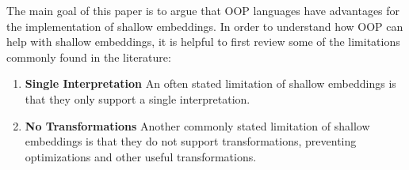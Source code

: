 \begin{comment}
If we accept Cook's view on OOP, 
a natural way to distinguish implementations of EDSLs is 
in terms of the data abstraction used to model the language
constructs instead. As Reynold's~\cite{reynolds94proceduralabstraction} suggested there are two
types of data abstraction: procedural abstraction and \emph{user-defined
  types}. It is clear that shallow embeddings use \emph{procedural
  abstraction}: the DSLs are modelled by interpretation
functions. Thus, the other implementation option for EDSLs is to
use \emph{user-defined types}. In Reynolds terminology user-defined
types mean disjoint union types, which are nowadays commonly available
in modern languages as \emph{algebraic datatypes}. Disjoint union
types can also be emulated in OOP using the {\sc Visitor} pattern. 

A distinction based on data abstraction is more precise and provides a
remedy for possible misinterpretation. An EDSL implemented with
algebraic datatypes falls into the category of user-defined types
(deep embedding), while a {\sc Composite}-based OO implementation falls
under procedural abstraction (shallow embedding). 
\end{comment}


The main goal of this paper is to argue that OOP languages have
advantages for the implementation of shallow embeddings. 
In order to understand how OOP can help with shallow embeddings, it is
helpful to
first review some of the limitations commonly
found in the literature:
\vspace{-5pt}
\begin{enumerate}

\item {\bf Single Interpretation} An often stated limitation of
  shallow embeddings is that they only support a single
  interpretation.

\item {\bf No Transformations} Another commonly stated limitation 
of shallow embeddings is that they do not support transformations,
preventing optimizations and other useful transformations.

\end{enumerate}
\vspace{-5pt}

